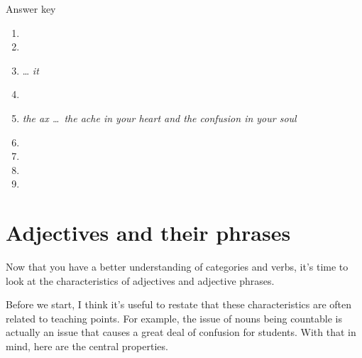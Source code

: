 \begin{tblsfilled}{Answer key}

\begin{enumerate}[noitemsep, leftmargin=*]
    \item {}
    \item {}
    \item {} \dots \textit{ it}
    \item {}
    \item \textit{the ax \dots~the ache in your heart and the confusion in your soul}
    \item {}
    \item {}
    \item {}
    \item {}
\end{enumerate}
\end{tblsfilled}

\section{Adjectives and their phrases}
\label{sec:adjs+adjPs}

Now that you have a better understanding of categories and verbs, it's time to look at the characteristics of adjectives and adjective phrases.

Before we start, I think it's useful to restate that these characteristics are often related to teaching points. For example, the issue of nouns being countable is actually an issue that causes a great deal of confusion for students. With that in mind, here are the central properties.

